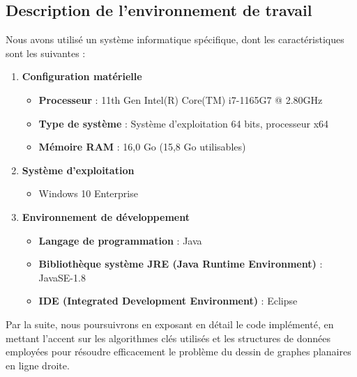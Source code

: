 \documentclass[hidelinks,letterpaper,12pt]{article}
\begin{document}
\subsection{Description de l'environnement de travail}
Nous avons utilisé un système informatique spécifique, dont les caractéristiques sont les suivantes :

\begin{enumerate}
\item \textbf{Configuration matérielle}
\begin{itemize}
	\item \textbf{Processeur} : 11th Gen Intel(R) Core(TM) i7-1165G7 @ 2.80GHz
	\item \textbf{Type de système} : Système d'exploitation 64 bits, processeur x64
	\item \textbf{Mémoire RAM} : 16,0 Go (15,8 Go utilisables)
\end{itemize}
\item \textbf{Système d'exploitation}
\begin{itemize}
	\item Windows 10 Enterprise
\end{itemize}
\item \textbf{Environnement de développement}
\begin{itemize}
	\item \textbf{Langage de programmation} : Java
	\item \textbf{Bibliothèque système JRE (Java Runtime Environment)} : JavaSE-1.8
	\item \textbf{IDE (Integrated Development Environment)} : Eclipse
\end{itemize}
\end{enumerate}


Par la suite, nous poursuivrons en exposant en détail le code implémenté, en mettant l'accent sur les algorithmes clés utilisés et les structures de données employées pour résoudre efficacement le problème du dessin de graphes planaires en ligne droite.
\\ \\
\end{document}
